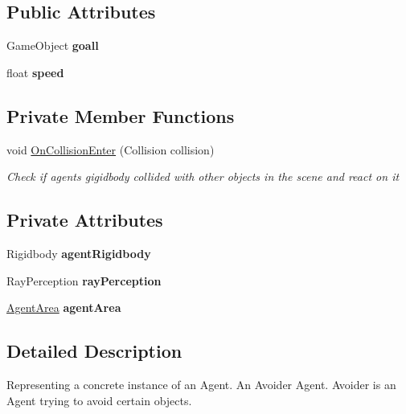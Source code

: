 \subsection*{Public Attributes}
\begin{DoxyCompactItemize}
\item 
\mbox{\label{class_avoider_agent_a7112c080dcf9de2decc093f8a721afac}} 
Game\+Object {\bfseries goall}
\item 
\mbox{\label{class_avoider_agent_a9375dfbe319b4173929706e2942fb248}} 
float {\bfseries speed}
\end{DoxyCompactItemize}
\subsection*{Private Member Functions}
\begin{DoxyCompactItemize}
\item 
void \mbox{\hyperlink{class_avoider_agent_a6f48bb4acf941004e6c18052277ee8b2}{On\+Collision\+Enter}} (Collision collision)
\begin{DoxyCompactList}\small\item\em Check if agents gigidbody collided with other objects in the scene and react on it \end{DoxyCompactList}\end{DoxyCompactItemize}
\subsection*{Private Attributes}
\begin{DoxyCompactItemize}
\item 
\mbox{\label{class_avoider_agent_ab4d00dec6bb80a0a1b1a3831212bcc7b}} 
Rigidbody {\bfseries agent\+Rigidbody}
\item 
\mbox{\label{class_avoider_agent_a24c35b66aac550d705199ef028e776f2}} 
Ray\+Perception {\bfseries ray\+Perception}
\item 
\mbox{\label{class_avoider_agent_aa9afcdeeffc5790eaeea6a590bc0b9e0}} 
\mbox{\hyperlink{class_agent_area}{Agent\+Area}} {\bfseries agent\+Area}
\end{DoxyCompactItemize}


\subsection{Detailed Description}
Representing a concrete instance of an Agent. An Avoider Agent. Avoider is an Agent trying to avoid certain objects. 



